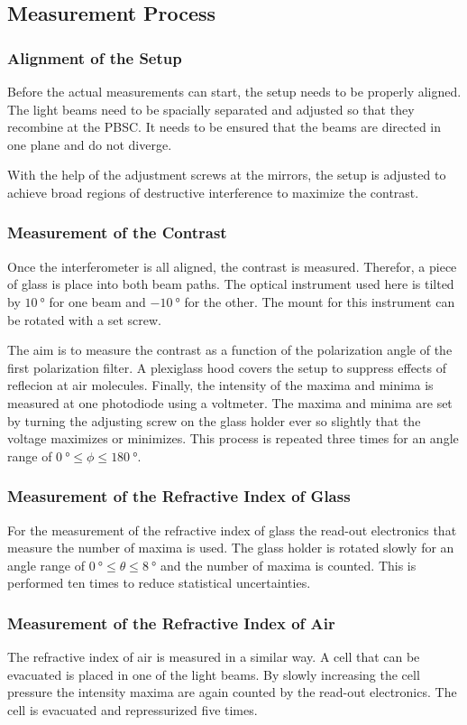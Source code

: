 \subsection{Measurement Process}
\label{sec:Measurement_process}
\subsubsection{Alignment of the Setup}
Before the actual measurements can start, the setup needs to be properly aligned. The light beams need to be spacially separated and adjusted so that they recombine
at the PBSC. It needs to be ensured that the beams are directed in one plane and do not diverge.

With the help of the adjustment screws at the mirrors, the setup is adjusted to achieve broad regions of destructive interference to maximize the contrast.

\subsubsection{Measurement of the Contrast}
\label{sec:Measure_contrast}
Once the interferometer is all aligned, the contrast is measured. Therefor, a piece of glass is place into both beam paths. The optical instrument used here is tilted
by $\qty{+10}{\degree}$ for one beam and $\qty{-10}{\degree}$ for the other. The mount for this instrument can be rotated with a set screw.

The aim is to measure the contrast as a function of the polarization angle of the first polarization filter. A plexiglass hood covers the setup to suppress effects of
reflecion at air molecules. Finally, the intensity of the maxima and minima is measured at one photodiode using a voltmeter. The maxima and minima are set by turning the adjusting 
screw on the glass holder ever so slightly that the voltage maximizes or minimizes. This process is repeated three times for an angle range of $\qty{0}{\degree}≤\phi≤\qty{180}{\degree}$.

\subsubsection{Measurement of the Refractive Index of Glass}
\label{sec:Measure_n_Glass}
For the measurement of the refractive index of glass the read-out electronics that measure the number of maxima is used. The glass holder is rotated slowly for an
angle range of $\qty{0}{\degree}≤\theta≤\qty{8}{\degree}$ and the number of maxima is counted. This is performed ten times to reduce statistical uncertainties.

\subsubsection{Measurement of the Refractive Index of Air}
\label{sec:Measure_n_Air}
The refractive index of air is measured in a similar way. A cell that can be evacuated is placed in one of the light beams. By slowly increasing the cell pressure
the intensity maxima are again counted by the read-out electronics. The cell is evacuated and repressurized five times.